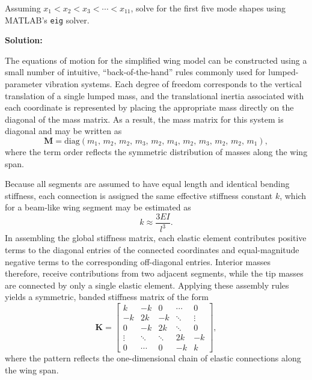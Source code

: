 \documentclass[12pt,letter]{article}
\begin{document}
\begin{example}
\noindent Assuming $x_1 < x_2 < x_3 < \cdots < x_11$, solve for the first five mode shapes using MATLAB's \texttt{eig} solver.


   
\noindent \textbf{Solution:} 
 
\noindent The equations of motion for the simplified wing model can be constructed using a small number of intuitive, ``back-of-the-hand'' rules commonly used for lumped-parameter vibration systems. Each degree of freedom corresponds to the vertical translation of a single lumped mass, and the translational inertia associated with each coordinate is represented by placing the appropriate mass directly on the diagonal of the mass matrix. As a result, the mass matrix for this system is diagonal and may be written as
\begin{equation}
\mathbf{M} = \mathrm{diag}\left(m_1,\, m_2,\, m_2,\, m_3,\, m_2,\, m_4,\, m_2,\, m_3,\, m_2,\, m_2,\, m_1\right),
\end{equation}
where the term order reflects the symmetric distribution of masses along the wing span.

Because all segments are assumed to have equal length and identical bending stiffness, each connection is assigned the same effective stiffness constant \(k\), which for a beam-like wing segment may be estimated as
\begin{equation}
k \approx \frac{3EI}{l^3}.
\end{equation}
In assembling the global stiffness matrix, each elastic element contributes positive terms to the diagonal entries of the connected coordinates and equal-magnitude negative terms to the corresponding off-diagonal entries. Interior masses therefore, receive contributions from two adjacent segments, while the tip masses are connected by only a single elastic element. Applying these assembly rules yields a symmetric, banded stiffness matrix of the form
\begin{equation}
\mathbf{K} =
\begin{bmatrix}
k & -k & 0 & \cdots & 0 \\
-k & 2k & -k & \ddots & \vdots \\
0 & -k & 2k & \ddots & 0 \\
\vdots & \ddots & \ddots & 2k & -k \\
0 & \cdots & 0 & -k & k
\end{bmatrix},
\end{equation}
where the pattern reflects the one-dimensional chain of elastic connections along the wing span.


\end{example}
\end{document}
